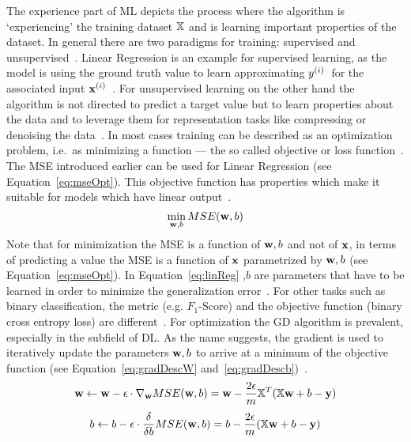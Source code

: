The experience part of \ac{ML} depicts the process where the algorithm is `experiencing' the training
dataset $\mathbb{X}$ and is learning important properties of the dataset.
In general there are two paradigms for training: supervised and
unsupervised~\citep{goodfellow_deep_2016}.
Linear Regression is an example for supervised learning, as the model is using the ground truth value
to learn approximating $y^{(i)}$\ for the associated input
$\textbf{x}^{(i)}$~\citep{alzubi_machine_2018,goodfellow_deep_2016}.
For unsupervised learning on the other hand the algorithm is not directed to predict a target
value but to learn properties about the data and to leverage them for representation tasks
like compressing or denoising the data~\citep{goodfellow_deep_2016,geron_hands-machine_2017}.
In most cases training can be described as an optimization problem, i.e.\ as minimizing a
function --- the so called objective or loss function~\citep{goodfellow_deep_2016}.
The MSE introduced earlier can be used for Linear Regression (see Equation~\ref{eq:mseOpt}).
This objective function has properties which make it suitable for models which have linear
output~\citep{goodfellow_deep_2016}.
\begin{equation}\label{eq:mseOpt}
    \min_{\textbf{w},b} MSE(\textbf{w},b)
\end{equation}
Note that for minimization the MSE is a function of $\textbf{w},b$ and not of $\textbf{x}$, in terms of
predicting a value the MSE is a function of $\textbf{x}$ parametrized by $\textbf{w},b$ (see Equation~\ref{eq:mseOpt}).
In Equation~\ref{eq:linReg} \w,$b$ are parameters that have to be learned in order to minimize
the generalization error~\citep{james_introduction_2013,geron_hands-machine_2017}.
For other tasks such as binary classification, the metric (e.g. $F_1$-Score) and the
objective function (binary cross entropy loss) are different~\citep{geron_hands-machine_2017,
ho_real-world-weight_2020}.
For optimization the \ac{GD} algorithm is prevalent, especially in the subfield of \ac{DL}.
As the name suggests, the gradient is used to iteratively update the parameters $\textbf{w},b$ to arrive
at a minimum of the objective function (see Equation~\ref{eq:gradDescW}
and~\ref{eq:gradDescb})~\citep{geron_hands-machine_2017}.
\begin{equation}\label{eq:gradDescW}
    \textbf{w} \leftarrow \textbf{w} - \epsilon \cdot \nabla_{\textbf{w}} MSE(\textbf{w},b) = \textbf{w}-\frac{2\epsilon}{m}\mathbb{X}^T (\mathbb{X}\textbf{w}+b-\textbf{y})
\end{equation}
\begin{equation}\label{eq:gradDescb}
    b \leftarrow b - \epsilon \cdot \frac{\delta}{\delta b} MSE(\textbf{w},b) = b-\frac{2\epsilon}{m}(\mathbb{X}\textbf{w}+b-\textbf{y})
\end{equation}
